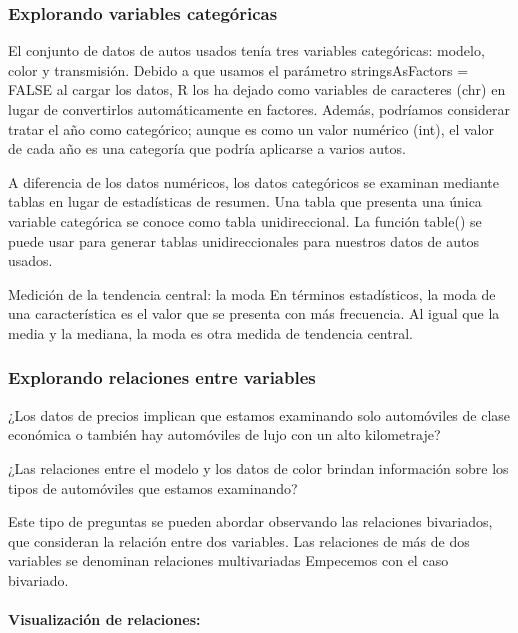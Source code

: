 \documentclass[
  letterpaper,
  DIV=11,
  numbers=noendperiod]{scrartcl}
\let\oldparagraph\paragraph
\renewcommand{\paragraph}[1]{\oldparagraph{#1}\mbox{}}
\begin{document}
\hypertarget{explorando-variables-categuxf3ricas}{%
\subsubsection{Explorando variables
categóricas}\label{explorando-variables-categuxf3ricas}}

El conjunto de datos de autos usados tenía tres variables categóricas:
modelo, color y transmisión. Debido a que usamos el parámetro
stringsAsFactors = FALSE al cargar los datos, R los ha dejado como
variables de caracteres (chr) en lugar de convertirlos automáticamente
en factores. Además, podríamos considerar tratar el año como categórico;
aunque es como un valor numérico (int), el valor de cada año es una
categoría que podría aplicarse a varios autos.

A diferencia de los datos numéricos, los datos categóricos se examinan
mediante tablas en lugar de estadísticas de resumen. Una tabla que
presenta una única variable categórica se conoce como tabla
unidireccional. La función table() se puede usar para generar tablas
unidireccionales para nuestros datos de autos usados.

Medición de la tendencia central: la moda En términos estadísticos, la
moda de una característica es el valor que se presenta con más
frecuencia. Al igual que la media y la mediana, la moda es otra medida
de tendencia central.

\hypertarget{explorando-relaciones-entre-variables}{%
\subsubsection{Explorando relaciones entre
variables}\label{explorando-relaciones-entre-variables}}

¿Los datos de precios implican que estamos examinando solo automóviles
de clase económica o también hay automóviles de lujo con un alto
kilometraje?

¿Las relaciones entre el modelo y los datos de color brindan información
sobre los tipos de automóviles que estamos examinando?

Este tipo de preguntas se pueden abordar observando las relaciones
bivariados, que consideran la relación entre dos variables. Las
relaciones de más de dos variables se denominan relaciones multivariadas
Empecemos con el caso bivariado.

\hypertarget{visualizaciuxf3n-de-relaciones}{%
\paragraph{\texorpdfstring{\textbf{Visualización de
relaciones:}}{Visualización de relaciones:}}\label{visualizaciuxf3n-de-relaciones}}
\end{document}
